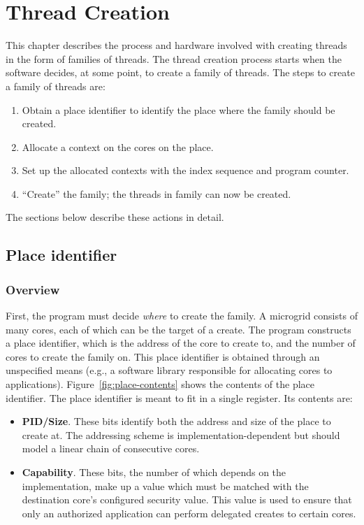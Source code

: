 \chapter{Thread Creation}

This chapter describes the process and hardware involved with creating threads in the form of families of threads. The thread creation process starts when the software decides, at some point, to create a family of threads. The steps to create a family of threads are:
\begin{enumerate}
\item Obtain a place identifier to identify the place where the family should be created.
\item Allocate a context on the cores on the place.
\item Set up the allocated contexts with the index sequence and program counter.
\item ``Create'' the family; the threads in family can now be created.
\end{enumerate}

The sections below describe these actions in detail.

\section{\label{sec:place-identifier}Place identifier}
\subsection{Overview}
First, the program must decide \emph{where} to create the family. A microgrid consists of many cores, each of which can be the target of a create. The program constructs a place identifier, which is the address of the core to create to, and the number of cores to create the family on. This place identifier is obtained through an unspecified means (e.g., a software library responsible for allocating cores to applications). Figure~\ref{fig:place-contents} shows the contents of the place identifier. The place identifier is meant to fit in a single register. Its contents are:
\begin{itemize}
\item {\bf PID/Size}. These bits identify both the address and size of the place to create at. The addressing scheme is implementation-dependent but should model a linear chain of consecutive cores.
\item {\bf Capability}. These bits, the number of which depends on the implementation, make up a value which must be matched with the destination core's configured security value. This value is used to ensure that only an authorized application can perform delegated creates to certain cores.
\end{itemize}


